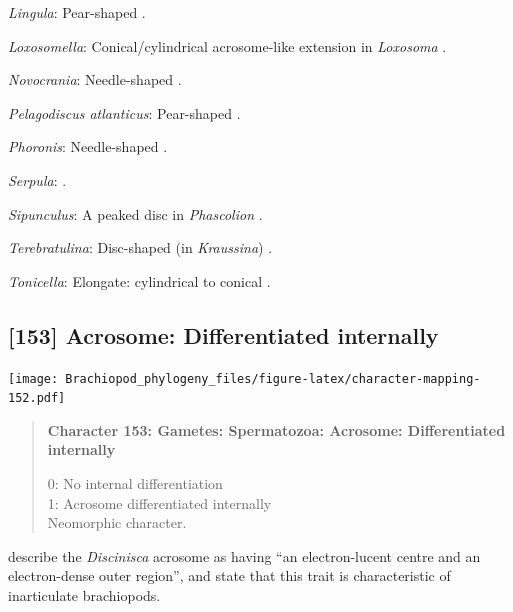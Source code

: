 \documentclass[openany]{book}
\begin{document}
\hypertarget{Lingula-coding-152}{}
\emph{Lingula}: Pear-shaped \citep{Fukumoto2003Theacrosome}.

\hypertarget{Loxosomella-coding-152}{}
\emph{Loxosomella}: Conical/cylindrical acrosome-like extension in
\emph{Loxosoma} \citep{Franzen2000}.

\hypertarget{Novocrania-coding-152}{}
\emph{Novocrania}: Needle-shaped \citep{Afzelius1978Finestructure}.

\hypertarget{Pelagodiscus_atlanticus-coding-152}{}
\emph{Pelagodiscus atlanticus}: Pear-shaped
\citep{Hodgson1994Ultrastructureof}.

\hypertarget{Phoronis-coding-152}{}
\emph{Phoronis}: Needle-shaped \citep{Reunov2004Ultrastructuralstudy}.

\hypertarget{Serpula-coding-152}{}
\emph{Serpula}: \citet{Gherardi2011}.

\hypertarget{Sipunculus-coding-152}{}
\emph{Sipunculus}: A peaked disc in \emph{Phascolion} \citep{Rice1993}.

\hypertarget{Terebratulina-coding-152}{}
\emph{Terebratulina}: Disc-shaped (in \emph{Kraussina})
\citep{Hodgson1994Ultrastructureof}.

\hypertarget{Tonicella-coding-152}{}
\emph{Tonicella}: Elongate: cylindrical to conical
\citep{BucklandNicks1988}.

\subsection*{{[}153{]} Acrosome: Differentiated
internally}\label{acrosome-differentiated-internally}

\texttt{[image: Brachiopod\_phylogeny\_files/figure-latex/character-mapping-152.pdf]}

\begin{quote}
\textbf{Character 153: Gametes: Spermatozoa: Acrosome: Differentiated
internally}

0: No internal differentiation\\
1: Acrosome differentiated internally\\
Neomorphic character.
\end{quote}

\citet{Hodgson1994Ultrastructureof} describe the \emph{Discinisca}
acrosome as having ``an electron-lucent centre and an electron-dense
outer region'', and state that this trait is characteristic of
inarticulate brachiopods.
\end{document}

